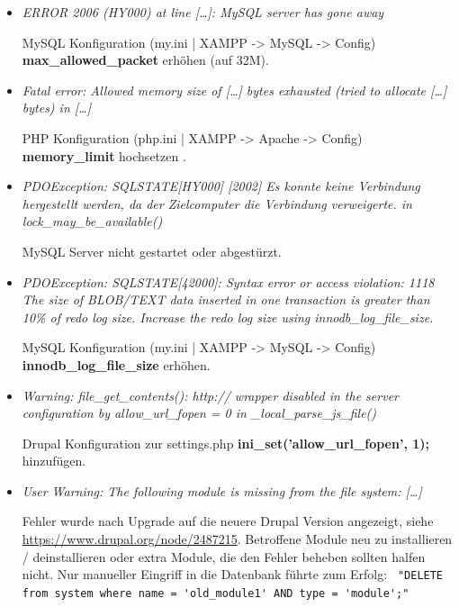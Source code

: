 \begin{itemize}[parsep=0pt, itemsep=5.0pt plus 2.0pt minus 1.0pt, leftmargin=*]
	\item \textit{ERROR 2006 (HY000) at line [\dots]: MySQL server has gone away}

	MySQL Konfiguration (my.ini | XAMPP -> MySQL -> Config)
	\textbf{max\_allowed\_packet} erhöhen (\zB auf 32M).


	\item \textit{Fatal error: Allowed memory size of [\dots] bytes exhausted (tried to allocate [\dots] bytes) in [\dots]}

	PHP Konfiguration (php.ini | XAMPP -> Apache -> Config)
	\textbf{memory\_limit} hochsetzen .


	\item \textit{PDOException: SQLSTATE[HY000] [2002] Es konnte keine Verbindung hergestellt werden, da der Zielcomputer die Verbindung verweigerte. in lock\_may\_be\_available()}

	MySQL Server nicht gestartet oder abgestürzt.


	\item \textit{PDOException: SQLSTATE[42000]: Syntax error or access violation: 1118 The size of BLOB/TEXT data inserted in one transaction is greater than 10\% of redo log size. Increase the redo log size using innodb\_log\_file\_size.}

	MySQL Konfiguration (my.ini | XAMPP -> MySQL -> Config)
	\textbf{innodb\_log\_file\_size} erhöhen.


	\item \textit{Warning: file\_get\_contents(): http:// wrapper disabled in the server configuration by allow\_url\_fopen = 0 in \_local\_parse\_js\_file()}

	Drupal Konfiguration zur settings.php \textbf{ini\_set('allow\_url\_fopen', 1);} hinzufügen.


	\item \textit{User Warning: The following module is missing from the file system: [\dots]}

	Fehler wurde nach Upgrade auf die neuere Drupal Version angezeigt, siehe \url{https://www.drupal.org/node/2487215}.
	Betroffene Module neu zu installieren / deinstallieren oder extra Module, die den Fehler beheben sollten halfen nicht. Nur manueller Eingriff in die Datenbank führte zum Erfolg: \lstinline| "DELETE from system where name = 'old_module1' AND type = 'module';"|

\end{itemize}



